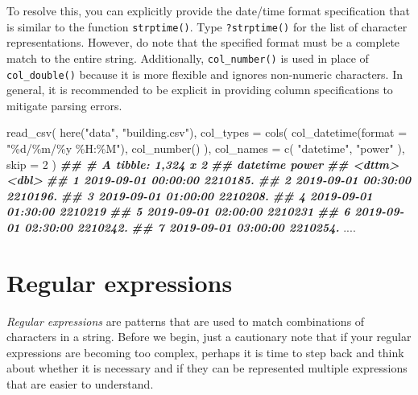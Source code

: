 \documentclass[
]{book}
\newenvironment{Shaded}{\begin{snugshade}}{\end{snugshade}}
\newcommand{\AttributeTok}[1]{\textcolor[rgb]{0.77,0.63,0.00}{#1}}
\newcommand{\DecValTok}[1]{\textcolor[rgb]{0.00,0.00,0.81}{#1}}
\newcommand{\DocumentationTok}[1]{\textcolor[rgb]{0.56,0.35,0.01}{\textbf{\textit{#1}}}}
\newcommand{\FunctionTok}[1]{\textcolor[rgb]{0.00,0.00,0.00}{#1}}
\newcommand{\NormalTok}[1]{#1}
\newcommand{\StringTok}[1]{\textcolor[rgb]{0.31,0.60,0.02}{#1}}
\begin{document}
To resolve this, you can explicitly provide the date/time format specification that is similar to the function \texttt{strptime()}. Type \texttt{?strptime()} for the list of character representations. However, do note that the specified format must be a complete match to the entire string. Additionally, \texttt{col\_number()} is used in place of \texttt{col\_double()} because it is more flexible and ignores non-numeric characters. In general, it is recommended to be explicit in providing column specifications to mitigate parsing errors.

\begin{Shaded}
\begin{Highlighting}[]
\FunctionTok{read\_csv}\NormalTok{(}
  \FunctionTok{here}\NormalTok{(}\StringTok{"data"}\NormalTok{, }\StringTok{"building.csv"}\NormalTok{),}
  \AttributeTok{col\_types =} \FunctionTok{cols}\NormalTok{(}
    \FunctionTok{col\_datetime}\NormalTok{(}\AttributeTok{format =} \StringTok{"\%d/\%m/\%y \%H:\%M"}\NormalTok{),}
    \FunctionTok{col\_number}\NormalTok{()}
\NormalTok{  ),}
  \AttributeTok{col\_names =} \FunctionTok{c}\NormalTok{(}
    \StringTok{"datetime"}\NormalTok{,}
    \StringTok{"power"}
\NormalTok{  ),}
  \AttributeTok{skip =} \DecValTok{2}
\NormalTok{)}
\DocumentationTok{\#\# \# A tibble: 1,324 x 2}
\DocumentationTok{\#\#    datetime               power}
\DocumentationTok{\#\#    \textless{}dttm\textgreater{}                 \textless{}dbl\textgreater{}}
\DocumentationTok{\#\#  1 2019{-}09{-}01 00:00:00 2210185.}
\DocumentationTok{\#\#  2 2019{-}09{-}01 00:30:00 2210196.}
\DocumentationTok{\#\#  3 2019{-}09{-}01 01:00:00 2210208.}
\DocumentationTok{\#\#  4 2019{-}09{-}01 01:30:00 2210219 }
\DocumentationTok{\#\#  5 2019{-}09{-}01 02:00:00 2210231 }
\DocumentationTok{\#\#  6 2019{-}09{-}01 02:30:00 2210242.}
\DocumentationTok{\#\#  7 2019{-}09{-}01 03:00:00 2210254.}
\NormalTok{....}
\end{Highlighting}
\end{Shaded}

\hypertarget{regular-expressions}{%
\chapter{Regular expressions}\label{regular-expressions}}

\emph{Regular expressions} are patterns that are used to match combinations of characters in a string. Before we begin, just a cautionary note that if your regular expressions are becoming too complex, perhaps it is time to step back and think about whether it is necessary and if they can be represented multiple expressions that are easier to understand.
\end{document}
